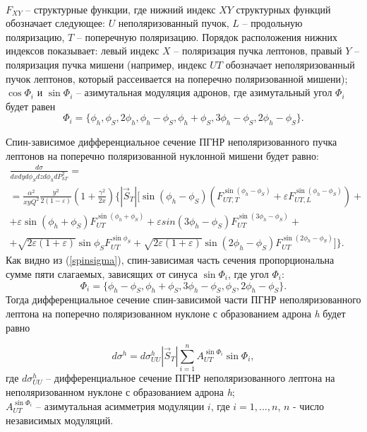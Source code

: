 \documentclass{extreport}
\begin{document}
\\
$F_{XY}$ -- структурные функции, где нижний индекс $XY$ структурных функций обозначает следующее: $U$ неполяризованный пучок, $L$ -- продольную поляризацию, $T$ -- поперечную поляризацию. Порядок расположения нижних индексов показывает: левый индекс $X$ -- поляризация пучка лептонов, правый $Y$ -- поляризация пучка мишени (например, индекс $UT$ обозначает неполяризованный пучок лептонов, который рассеивается на поперечно поляризованной мишени);
\\
$\cos \Phi_i$ и $ \sin \Phi_i$ -- азимутальная модуляция адронов, где азимутальный угол $\Phi_i$ будет равен 
\begin{equation}
	\Phi_i =  \lbrace \phi_h, \phi_S, 2\phi_h, \phi_h - \phi_S, \phi_h + \phi_S, 3\phi_h - \phi_S, 2\phi_h - \phi_S \rbrace.
\end{equation}

Спин-зависимое дифференциальное сечение ПГНР неполяризованного пучка лептонов на поперечно поляризованной нуклонной мишени будет равно:
\begin{multline}
	\label{spinsigma}
	\frac{d\sigma}{dx dy d \phi_S dz d \phi_{h} dP^{2}_{h T}} = \\
	= \frac{\alpha^2}{xy Q^{2}} \frac{y^2}{2 (1 - \varepsilon)} \left(1 + \frac{\gamma^2}{2x} \right) \Biggl \lbrace 	
	 |\vec S_{T}| \Biggl[ \sin(\phi_h - \phi_S) \left(F_{U T, T}^{\sin(\phi_h - \phi_S)} +
	\varepsilon F_{UT, L}^{\sin(\phi_h - \phi_S)} \right) + \\
	+ \varepsilon \sin(\phi_h + \phi_S) F_{U T}^{\sin (\phi_h + \phi_S)} +
	\varepsilon sin (3\phi_h - \phi_S) F_{UT}^{\sin (3\phi_h - \phi_S)} + \\
	+ \sqrt{2 \varepsilon (1 + \varepsilon)} \sin \phi_S F_{UT}^{\sin \phi_S} +
	\sqrt{2 \varepsilon (1 + \varepsilon)} \sin(2\phi_h - \phi_S) F_{UT}^{\sin(2\phi_h - \phi_S)}  \Biggr ]\Biggr \rbrace.
\end{multline}
Как видно из (\ref{spinsigma}), спин-зависимая часть сечения пропорциональна сумме пяти слагаемых, зависящих от синуса $\sin \Phi_i$, где угол $\Phi_i$:  
\begin{equation}
	\Phi_i = \lbrace \phi_h - \phi_S, \phi_h + \phi_S, 3\phi_h - \phi_S, \phi_S,2 \phi_h - \phi_S \rbrace. 
\end{equation}
Тогда дифференциальное сечение спин-зависимой части ПГНР неполяризованного лептона на поперечно поляризованном нуклоне с образованием адрона \textit{h} будет равно

\begin{equation}
	\label{eq:asym}
	d\sigma^h = d\sigma^h_{UU} |\vec S_{T}| \sum_{i = 1}^n A_{UT}^{\sin \Phi_i} \sin \Phi_i,
\end{equation}
где $d\sigma^h_{UU}$ -- дифференциальное сечение ПГНР неполяризованного лептона на неполяризованном нуклоне с образованием адрона \textit{h}; \\ $A_{UT}^{\sin \Phi_i}$ -- азимутальная асимметрия модуляции $i$, где $i = 1, ... , n$, $n$ - число независимых модуляций.
\end{document}
